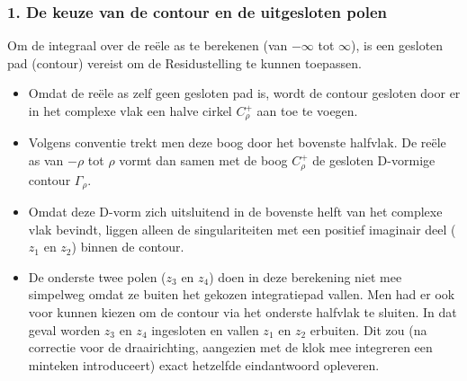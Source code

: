 \documentclass[a4paper,twoside]{article}
\theoremstyle{definition}
\theoremstyle{plain}
\begin{document}
\subsubsection*{1. De keuze van de contour en de uitgesloten polen}
Om de integraal over de reële as te berekenen (van $-\infty$ tot $\infty$), is een gesloten pad (contour) vereist om de Residustelling te kunnen toepassen.
\begin{itemize}
    \item Omdat de reële as zelf geen gesloten pad is, wordt de contour gesloten door er in het complexe vlak een halve cirkel $C_\rho^+$ aan toe te voegen.
    \item Volgens conventie trekt men deze boog door het bovenste halfvlak. De reële as van $-\rho$ tot $\rho$ vormt dan samen met de boog $C_\rho^+$ de gesloten D-vormige contour $\Gamma_\rho$.
    \item Omdat deze D-vorm zich uitsluitend in de bovenste helft van het complexe vlak bevindt, liggen alleen de singulariteiten met een positief imaginair deel ($z_1$ en $z_2$) binnen de contour.
    \item De onderste twee polen ($z_3$ en $z_4$) doen in deze berekening niet mee simpelweg omdat ze buiten het gekozen integratiepad vallen. Men had er ook voor kunnen kiezen om de contour via het onderste halfvlak te sluiten. In dat geval worden $z_3$ en $z_4$ ingesloten en vallen $z_1$ en $z_2$ erbuiten. Dit zou (na correctie voor de draairichting, aangezien met de klok mee integreren een minteken introduceert) exact hetzelfde eindantwoord opleveren.
\end{itemize}
\end{document}
